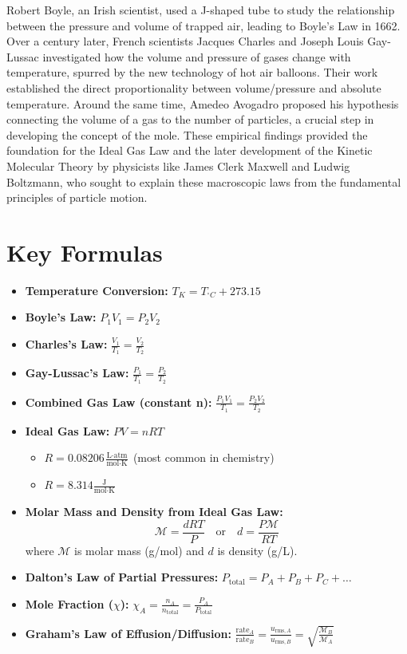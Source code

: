 \documentclass{article}
\begin{document}
Robert Boyle, an Irish scientist, used a J-shaped tube to study the relationship between the pressure and volume of trapped air, leading to Boyle's Law in 1662. Over a century later, French scientists Jacques Charles and Joseph Louis Gay-Lussac investigated how the volume and pressure of gases change with temperature, spurred by the new technology of hot air balloons. Their work established the direct proportionality between volume/pressure and absolute temperature. Around the same time, Amedeo Avogadro proposed his hypothesis connecting the volume of a gas to the number of particles, a crucial step in developing the concept of the mole. These empirical findings provided the foundation for the Ideal Gas Law and the later development of the Kinetic Molecular Theory by physicists like James Clerk Maxwell and Ludwig Boltzmann, who sought to explain these macroscopic laws from the fundamental principles of particle motion.

\section{Key Formulas}
\begin{itemize}
    \item \textbf{Temperature Conversion:} $T_K = T_{^{\circ}C} + 273.15$
    \item \textbf{Boyle's Law:} $P_1V_1 = P_2V_2$
    \item \textbf{Charles's Law:} $\frac{V_1}{T_1} = \frac{V_2}{T_2}$
    \item \textbf{Gay-Lussac's Law:} $\frac{P_1}{T_1} = \frac{P_2}{T_2}$
    \item \textbf{Combined Gas Law (constant n):} $\frac{P_1V_1}{T_1} = \frac{P_2V_2}{T_2}$
    \item \textbf{Ideal Gas Law:} $PV = nRT$
        \begin{itemize}
            \item $R = 0.08206 \frac{\text{L} \cdot \text{atm}}{\text{mol} \cdot \text{K}}$ (most common in chemistry)
            \item $R = 8.314 \frac{\text{J}}{\text{mol} \cdot \text{K}}$
        \end{itemize}
    \item \textbf{Molar Mass and Density from Ideal Gas Law:}
        \[ \mathcal{M} = \frac{dRT}{P} \quad \text{or} \quad d = \frac{P\mathcal{M}}{RT} \]
        where $\mathcal{M}$ is molar mass (g/mol) and $d$ is density (g/L).
    \item \textbf{Dalton's Law of Partial Pressures:} $P_{\text{total}} = P_A + P_B + P_C + \dots$
    \item \textbf{Mole Fraction ($\chi$):} $\chi_A = \frac{n_A}{n_{\text{total}}} = \frac{P_A}{P_{\text{total}}}$
    \item \textbf{Graham's Law of Effusion/Diffusion:} $\frac{\text{rate}_A}{\text{rate}_B} = \frac{u_{\text{rms},A}}{u_{\text{rms},B}} = \sqrt{\frac{\mathcal{M}_B}{\mathcal{M}_A}}$
\end{itemize}
\end{document}
